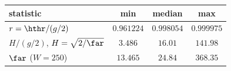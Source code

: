 \begin{tabular}{@{}lccc@{}}
\toprule
statistic & min & median & max\\
\midrule
$r=\hthr/(g/2)$ & $0.961224$ & $0.998054$ & $0.999975$\\
$H/(g/2)$, $H=\sqrt{2/\far}$ & $3.486$ & $16.01$ & $141.98$\\
$\far$ ($W=250$) & $13.465$ & $24.84$ & $368.35$\\
\bottomrule
\end{tabular}
